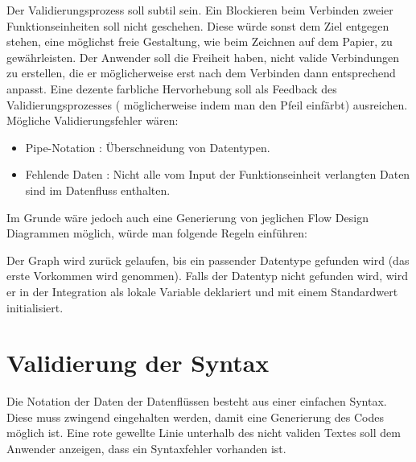 Der Validierungsprozess soll subtil sein. Ein Blockieren beim Verbinden zweier Funktionseinheiten soll nicht geschehen. Diese würde sonst dem Ziel entgegen stehen,
eine möglichst freie Gestaltung, wie beim Zeichnen auf dem Papier, zu
gewährleisten. Der Anwender soll die Freiheit haben, nicht valide Verbindungen
zu erstellen, die er möglicherweise erst nach dem Verbinden dann entsprechend
anpasst. Eine dezente farbliche Hervorhebung soll als Feedback des
Validierungsprozesses ( möglicherweise indem man den Pfeil einfärbt) ausreichen. Mögliche Validierungsfehler wären:
\begin{itemize}
\item Pipe-Notation : Überschneidung von Datentypen.
\item Fehlende Daten : Nicht alle vom Input der Funktionseinheit verlangten Daten
sind im Datenfluss enthalten.
\end{itemize}

Im Grunde wäre jedoch auch eine Generierung von jeglichen Flow Design Diagrammen
möglich, würde man folgende Regeln einführen:

Der Graph wird zurück gelaufen, bis ein passender Datentype
gefunden wird (das erste Vorkommen wird genommen). Falls der Datentyp nicht
gefunden wird, wird er in der Integration als lokale Variable deklariert und mit einem Standardwert initialisiert.


\section{Validierung der Syntax}

Die Notation der Daten der Datenflüssen besteht aus einer einfachen Syntax. Diese muss zwingend eingehalten
 werden, damit eine Generierung des Codes möglich ist.
 Eine rote gewellte Linie unterhalb des nicht validen Textes soll dem Anwender
 anzeigen, dass ein Syntaxfehler vorhanden ist.

